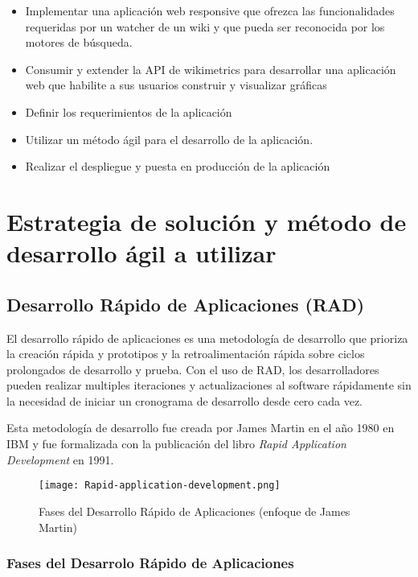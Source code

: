 \begin{itemize}
    \item Implementar una aplicación web responsive que ofrezca las funcionalidades requeridas por un watcher de un wiki y que pueda ser reconocida por los motores de búsqueda.
    \item Consumir y extender la API de wikimetrics para desarrollar una aplicación web que habilite a sus usuarios construir y visualizar gráficas
    \item Definir los requerimientos de la aplicación
    \item Utilizar un método ágil para el desarrollo de la aplicación.
    \item Realizar el despliegue y puesta en producción de la aplicación
\end{itemize}

\section{Estrategia de solución y método de desarrollo ágil a utilizar}

\subsection{Desarrollo Rápido de Aplicaciones (RAD)}


El desarrollo rápido de aplicaciones es una metodología de desarrollo que prioriza la creación rápida y prototipos y la retroalimentación rápida sobre ciclos prolongados de desarrollo y prueba. Con el uso de RAD, los desarrolladores pueden realizar multiples iteraciones y actualizaciones al software rápidamente sin la necesidad de iniciar un cronograma de desarrollo desde cero cada vez.

Esta metodología de desarrollo fue creada por James Martin en el año 1980 en IBM y fue formalizada con la publicación del libro \emph{Rapid Application Development} en 1991.

\begin{figure}[H]
    \texttt{[image: Rapid-application-development.png]}
    \caption{Fases del Desarrollo Rápido de Aplicaciones (enfoque de James Martin)}
    \label{fig:Rapid-application-development}
\end{figure}

\subsubsection{Fases del Desarrolo Rápido de Aplicaciones}

